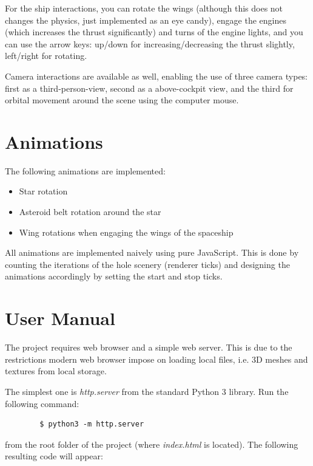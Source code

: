\documentclass[12pt,a4paper]{report}
\begin{document}
	For the ship interactions, you can rotate the wings (although this does not changes the physics, just implemented as an eye candy), engage the engines (which increases the thrust significantly) and turns of the engine lights, and you can use the arrow keys: up/down for increasing/decreasing the thrust slightly, left/right for rotating.
	
	Camera interactions are available as well, enabling the use of three camera types: first as a third-person-view, second as a above-cockpit view, and the third for orbital movement around the scene using the computer mouse.
	
	\section{Animations}
	
	The following animations are implemented:
	
	\begin{itemize}
		\item Star rotation
		\item Asteroid belt rotation around the star
		\item Wing rotations when engaging the wings of the spaceship
	\end{itemize}

	All animations are implemented naively using pure JavaScript. This is done by counting the iterations of the hole scenery (renderer ticks) and designing the animations accordingly by setting the start and stop ticks.	
	
	\section{User Manual}
	
	The project requires web browser and a simple web server. This is due to the restrictions modern web browser impose on loading local files, i.e. 3D meshes and textures from local storage.
	
	The simplest one is \textit{http.server} from the standard Python 3 library. Run the following command:
	
	\begin{verbatim}
		$ python3 -m http.server
	\end{verbatim}
	
	from the root folder of the project (where \textit{index.html} is located). The following resulting code will appear:
	
\end{document}

